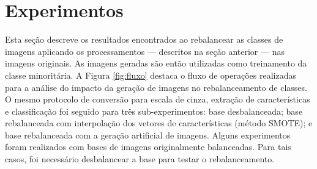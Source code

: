 %
%




\section{Experimentos}
\label{sec:resultados-geracao}

Esta seção descreve os resultados encontrados ao rebalancear as classes de imagens aplicando os processamentos --- descritos na seção anterior --- nas imagens originais. As imagens geradas são então utilizadas como treinamento da classe minoritária. A Figura \ref{fig:fluxo} destaca o fluxo de operações realizadas para a análise do impacto da geração de imagens no rebalanceamento de classes. O mesmo protocolo de conversão para escala de cinza, extração de características e classificação foi seguido para três sub-experimentos: base desbalanceada; base rebalanceada com interpolação dos vetores de características (método SMOTE); e base rebalanceada com a geração artificial de imagens. Alguns experimentos foram realizados com bases de imagens originalmente balanceadas. Para tais casos, foi necessário desbalancear a base para testar o rebalanceamento.

